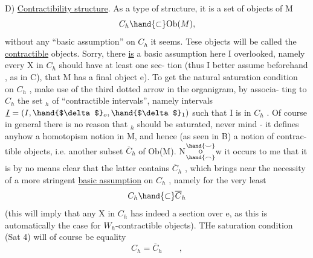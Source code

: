 D) \uline{Contractibility structure}.  As a type of structure, it is a
set of objects of M
\[ C_h\hand{\ensuremath{\subset}}\mathrm{Ob}(M) , \]
without any ``basic assumption'' on $C_h$ it seems. Tese objects will be
called the \uline{contractible} objects. Sorry, there \uline{is} a basic assumption
here I  overlooked,  namely every X in $C_h$ should have at least one sec-%
tion (thus I better assume beforehand , as in C), that M has a final
object e). To get the natural saturation condition on $C_h$ , 
 make use of the third dotted arrow in the organigram, by associa-%
ting to $C_h$ the set \hand{$\Sigma$}$_h$ of ``contractible intervals'', namely intervals
$\underline{I} = (I, \hand{$\delta$}_o,\hand{$\delta$}_1)$ such that I is in $C_h$ . Of course in general there is no
reason that \hand{$\Sigma$}$_h$ should be saturated, never mind - it defines anyhow 
a homotopism notion in M, and hence (as seen in B) a notion of contrac-%
tible objects, i.e. another subset $\overline{C}_h$ of Ob(M). N$\overset{\hand{\smile}}{\underset{\hand{\frown}}{\mathrm o}}$w it occurs to  me
that it is by no means clear that the latter contains $\overline{C}_h$ , which
brings near the necessity of a more stringent \uline{basic assumption} on $C_h$ ,
namely for the very least
\[ C_h\hand{\ensuremath{\subset}}\overline{C}_h \]
(this will imply that any X in $C_h$ has indeed a section over e, as this
is automatically the case for $W_h$-contractible objects). THe saturation
condition (Sat 4) will of course be equality
\[ C_h = \overline{C}_h \qquad , \]
